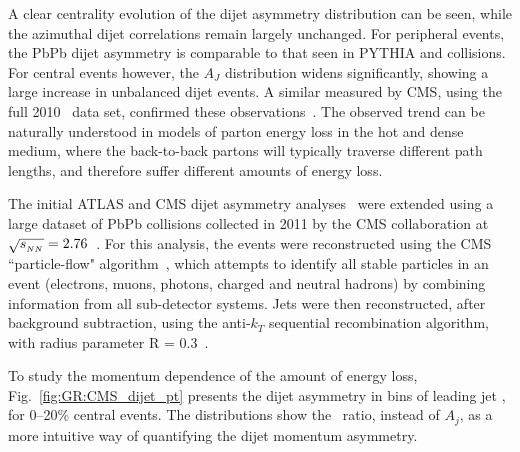 A clear centrality evolution of the dijet asymmetry distribution can be seen, while the azimuthal
dijet correlations remain largely unchanged. For peripheral events, the PbPb dijet asymmetry
is comparable to that seen in PYTHIA and \pp collisions. For central events however, 
the $A_J$ distribution widens significantly, showing a large increase in unbalanced
dijet events. 
A similar measured by CMS, using the full 2010 \PbPb\ data set, confirmed these 
observations~\cite{Chatrchyan:2011sx}.
The observed trend can be naturally understood in models of parton energy
loss in the hot and dense medium, where the back-to-back partons will typically traverse
different path lengths, and therefore suffer different amounts of energy loss. 

The initial ATLAS and CMS dijet asymmetry analyses~\cite{Aad:2010bu,Chatrchyan:2011sx}
 were extended using a large dataset of PbPb collisions
collected in 2011 by the CMS collaboration at $\sqrt{s_{_{NN}}}=2.76$\TeV~\cite{CMS_dijet}. For this analysis, the events were 
reconstructed using the  CMS ``particle-flow" algorithm~\cite{CMS-PAS-PFT-10-002,MattPFlow}, 
which attempts to identify all stable particles in an
event (electrons, muons, photons, charged and neutral hadrons)
by combining information from all sub-detector systems.
Jets were then reconstructed, after background subtraction, using the anti-$k_T$ sequential recombination algorithm, 
with radius parameter R = 0.3~\cite{Cacciari:2008gp}.

To study the momentum dependence of the amount of energy loss,
Fig.~\ref{fig:GR:CMS_dijet_pt} presents the dijet asymmetry in bins of leading jet
\pT, for 0--20\% central events. 
The distributions show the \ptrat\ ratio, instead of $A_j$,  as a more intuitive 
way of quantifying the dijet momentum asymmetry.

